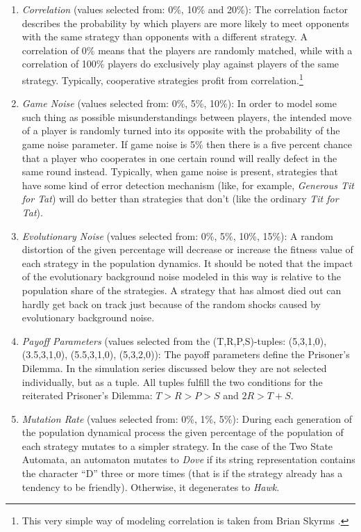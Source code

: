 \begin{enumerate}
\item {\em Correlation} (values selected from: 0\%, 10\% and 20\%): The
  correlation factor describes the probability by which players are more
  likely to meet opponents with the same strategy than opponents with a
  different strategy. A correlation of 0\% means that the players are randomly
  matched, while with a correlation of 100\% players do exclusively play
  against players of the same strategy.  Typically, cooperative strategies
  profit from correlation.\footnote{This very simple way of modeling
    correlation is taken from Brian Skyrms \cite[]{skyrms:1996}.}

\item {\em Game Noise} (values selected from: 0\%, 5\%, 10\%): In order to
  model some such thing as possible misunderstandings between players, the
  intended move of a player is randomly turned into its opposite with the
  probability of the game noise parameter. If game noise is 5\% then there is
  a five percent chance that a player who cooperates in one certain round
  will really defect in the same round instead. Typically, when game noise is
  present, strategies that have some kind of error detection mechanism (like,
  for example, {\em Generous Tit for Tat}) will do better than strategies that
  don't (like the ordinary {\em Tit for Tat}).

\item {\em Evolutionary Noise} (values selected from: 0\%, 5\%, 10\%, 15\%): A
  random distortion of the given percentage will decrease or increase the
  fitness value of each strategy in the population dynamics. It should be
  noted that the impact of the evolutionary background noise modeled in this
  way is relative to the population share of the strategies. A strategy that
  has almost died out can hardly get back on track just because of the random
  shocks caused by evolutionary background noise.

\item {\em Payoff Parameters} (values selected from the (T,R,P,S)-tuples:
  (5,3,1,0), (3.5,3,1,0), (5.5,3,1,0), (5,3,2,0)): The payoff parameters
  define the Prisoner's Dilemma. In the simulation series discussed below they
  are not selected individually, but as a tuple. All tuples fulfill the
  two conditions for the reiterated Prisoner's Dilemma: $T>R>P>S$ and $2R >
  T+S$.

\item {\em Mutation Rate} \label{mutationRate}(values selected from: 0\%, 1\%,
  5\%): During each generation of the population dynamical process the given
  percentage of the population of each strategy mutates to a simpler strategy.
  In the case of the Two State Automata, an automaton mutates to {\em
    Dove} if its string representation contains the character ``D'' three or
  more times (that is if the strategy already has a tendency to be friendly).
  Otherwise, it degenerates to {\em Hawk}.


\end{enumerate}
